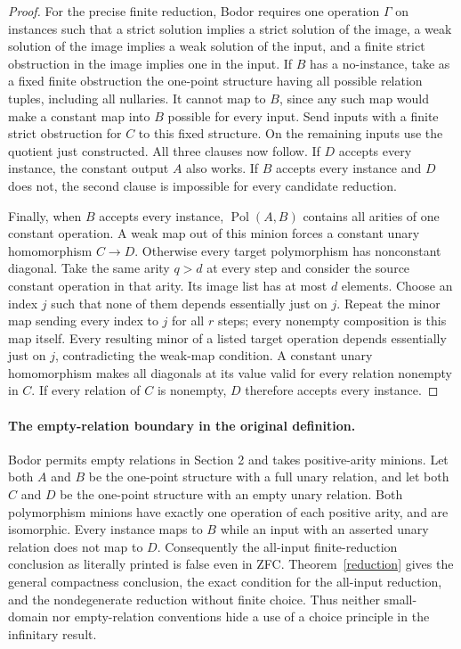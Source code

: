 \documentclass[11pt]{article}
\newcommand{\Pol}{\operatorname{Pol}}
\begin{document}
\begin{proof}
For the precise finite reduction, Bodor requires one operation $\Gamma$ on instances such that a strict solution implies a strict solution of the image, a weak solution of the image implies a weak solution of the input, and a finite strict obstruction in the image implies one in the input. If $B$ has a no-instance, take as a fixed finite obstruction the one-point structure having all possible relation tuples, including all nullaries. It cannot map to $B$, since any such map would make a constant map into $B$ possible for every input. Send inputs with a finite strict obstruction for $C$ to this fixed structure. On the remaining inputs use the quotient just constructed. All three clauses now follow. If $D$ accepts every instance, the constant output $A$ also works. If $B$ accepts every instance and $D$ does not, the second clause is impossible for every candidate reduction.

Finally, when $B$ accepts every instance, $\Pol(A,B)$ contains all arities of one constant operation. A weak map out of this minion forces a constant unary homomorphism $C\to D$. Otherwise every target polymorphism has nonconstant diagonal. Take the same arity $q>d$ at every step and consider the source constant operation in that arity. Its image list has at most $d$ elements. Choose an index $j$ such that none of them depends essentially just on $j$. Repeat the minor map sending every index to $j$ for all $r$ steps; every nonempty composition is this map itself. Every resulting minor of a listed target operation depends essentially just on $j$, contradicting the weak-map condition. A constant unary homomorphism makes all diagonals at its value valid for every relation nonempty in $C$. If every relation of $C$ is nonempty, $D$ therefore accepts every instance.
\end{proof}

\paragraph{The empty-relation boundary in the original definition.}
Bodor permits empty relations in Section 2 and takes positive-arity minions. Let both $A$ and $B$ be the one-point structure with a full unary relation, and let both $C$ and $D$ be the one-point structure with an empty unary relation. Both polymorphism minions have exactly one operation of each positive arity, and are isomorphic. Every instance maps to $B$ while an input with an asserted unary relation does not map to $D$. Consequently the all-input finite-reduction conclusion as literally printed is false even in ZFC. Theorem~\ref{reduction} gives the general compactness conclusion, the exact condition for the all-input reduction, and the nondegenerate reduction without finite choice. Thus neither small-domain nor empty-relation conventions hide a use of a choice principle in the infinitary result.
\end{document}
